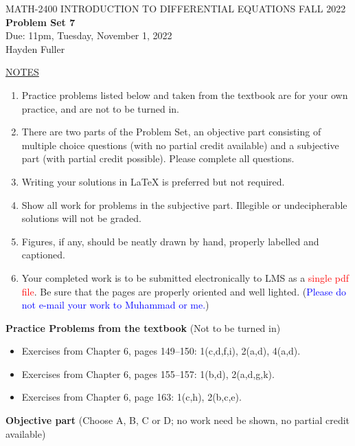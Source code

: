 \documentclass{article}
\begin{document}
\begin{center}
\large{ MATH-2400 \hspace{.27in}  INTRODUCTION TO DIFFERENTIAL EQUATIONS \hspace{.27in}FALL 2022\bigskip\\ {\bf Problem Set 7} \smallskip\\ Due: 11pm, Tuesday, November 1, 2022}
\\Hayden Fuller
\end{center}

\bigskip\noindent
\underline{NOTES}
\begin{enumerate}
\item Practice problems listed below and taken from the textbook are for your own practice, and are not to be turned in.
\item There are two parts of the Problem Set, an objective part consisting of multiple choice questions (with no partial credit available) and a subjective part (with partial credit possible).  Please complete all questions.
\item Writing your solutions in {\LaTeX} is preferred but not required.
\item Show all work for problems in the subjective part.  Illegible or undecipherable solutions will not be graded. 
\item Figures, if any, should be neatly drawn by hand, properly labelled and captioned.  
\item Your completed work is to be submitted electronically to LMS  as a \textcolor{red}{single pdf file}. Be sure that the pages are properly oriented and well lighted.  (\textcolor{blue}{Please do not e-mail your work to Muhammad or me.})
\end{enumerate}

\bigskip\noindent
{\bf Practice Problems from the textbook} (Not to be turned in)
\begin{itemize}
\item
Exercises from Chapter 6, pages 149--150: 1(c,d,f,i), 2(a,d), 4(a,d).
\item
Exercises from Chapter 6, pages 155--157: 1(b,d), 2(a,d,g,k).
\item
Exercises from Chapter 6, page 163: 1(c,h), 2(b,c,e).
\end{itemize}

\bigskip\noindent
{\bf Objective part} (Choose A, B, C or D; no work need be shown, no partial credit available)
\end{document}
